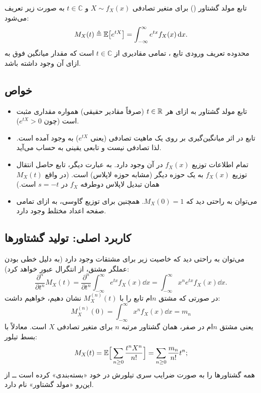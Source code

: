 \begin{definition}
تابع مولد گشتاور () برای متغیر تصادفی $X\sim f_X(x)$ و $t\in\mathbb C$ به صورت زیر تعریف می‌شود:
\[
M_X(t)\triangleq\mathbb{E}\big[e^{tX}\big]=\int_{-\infty}^{\infty}e^{tx}f_X(x)\,\mathrm{d} x .
\]
محدوده تعریف ورودی تابع ، تمامی مقادیری از $t\in\mathbb C$ است که مقدار میانگین فوق به ازای آن وجود داشته باشد.
\end{definition}

\subsection{خواص}
\begin{itemize}
\item تابع مولد گشتاور به ازای هر $t\in\mathbb{R}$ (صرفاً مقادیر حقیقی) همواره مقداری مثبت است (چون $e^{tX}>0$).
\item تابع  در اثر میانگین‌گیری بر روی یک ماهیت تصادفی (یعنی $e^{tX}$) به وجود آمده است. لذا  تصادفی نیست و تابعی یقینی به حساب می‌آید.
\item تمام اطلاعات توزیع $f_X(x)$ در  آن وجود دارد. به عبارت دیگر، تابع  حاصل انتقال توزیع $f_X(x)$ به \textcolor{red!70!black}{یک حوزه دیگر (مشابه حوزه لاپلاس)} است. (در واقع $M_X(t)$ همان تبدیل لاپلاس دوطرفه $f_X$ در $s=-t$ است.)
\item می‌توان به راحتی دید که $M_X(0)=1$. همچنین برای \textcolor{blue!60!black}{توزیع گاوسی}،  به ازای تمامی صفحه اعداد مختلط وجود دارد.
\end{itemize}

\subsection{کاربرد اصلی: تولید گشتاورها}
می‌توان به راحتی دید که خاصیت زیر برای مشتقات  وجود دارد (به دلیل خطی بودن عملگر مشتق، از انتگرال عبور خواهد کرد):
\[
\frac{\partial^n}{\partial t^n}M_X(t)=\frac{\partial^n}{\partial t^n}\int_{-\infty}^{\infty}e^{tx}f_X(x)\dd x=\int_{-\infty}^{\infty}x^ne^{tx}f_X(x)\dd x .
\]
در صورتی که مشتق $n$ام تابع  را با $M_X^{(n)}(t)$ نشان دهیم، خواهیم داشت:
\[
\boxed{\ M_X^{(n)}(0)=\int_{-\infty}^{\infty}x^nf_X(x)\dd x=m_n\ }
\]
یعنی مشتق $n$ام در صفر، همان \textcolor{blue!60!black}{گشتاور} مرتبه $n$ برای متغیر تصادفی $X$ است. معادلاً با بسط تیلور:
\[
M_X(t)=\mathbb{E}\Big[\sum_{n\ge0}\frac{t^nX^n}{n!}\Big]=\sum_{n\ge0}\frac{m_n}{n!}t^n ;
\]
 همه گشتاورها را به صورت ضرایب سری تیلورش در خود «بسته‌بندی» کرده است ــ از این‌رو «مولد گشتاور» نام دارد.


